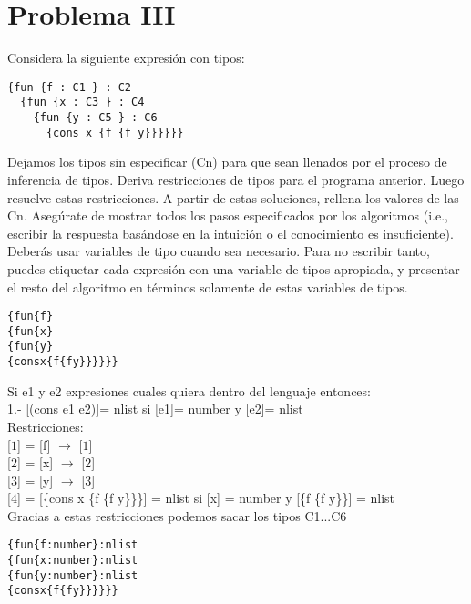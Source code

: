 \documentclass{article}
\begin{document}
  

\section*{Problema III}
Considera la siguiente expresión con tipos:

\begin{verbatim}
{fun {f : C1 } : C2
  {fun {x : C3 } : C4
    {fun {y : C5 } : C6
      {cons x {f {f y}}}}}}
\end{verbatim}

Dejamos los tipos sin especificar (Cn) para que sean llenados por el proceso
de inferencia de tipos. Deriva restricciones de tipos para el programa anterior.
Luego resuelve estas restricciones. A partir de estas soluciones, rellena los
valores de las Cn. Asegúrate de mostrar todos los pasos especificados por los
algoritmos (i.e., escribir la respuesta basándose en la intuición o el conocimiento
es insuficiente). Deberás usar variables de tipo cuando sea necesario.
Para no escribir tanto, puedes etiquetar cada expresión con una variable de tipos
apropiada, y presentar el resto del algoritmo en términos solamente de estas
variables de tipos.

\begin{alltt}
\{  fun \{f\}
  \{  fun \{x\}
    \{  fun \{y\}
      \{  cons  x   \{f \{f y\}\}\}\}\}\}
\end{alltt}

Si e1 y e2 expresiones cuales quiera dentro del lenguaje entonces:\\
 1.- [(cons e1 e2)]= nlist si [e1]= number y [e2]= nlist\\

Restricciones:\\

[$\boxed{1}$] = [f] $\rightarrow$ [$\boxed{1}$] \\

[$\boxed{2}$] = [x] $\rightarrow$ [$\boxed{2}$] \\

[$\boxed{3}$] = [y] $\rightarrow$ [$\boxed{3}$] \\

[$\boxed{4}$] = [\{cons x \{f \{f y\}\}\}] = nlist si [x] = number y [\{f \{f y\}\}] = nlist \\


Gracias a estas restricciones podemos sacar los tipos C1...C6
\begin{alltt}
\{fun \{f : number \} : nlist
  \{fun \{x : number \} : nlist
    \{fun \{y : number \} : nlist
      \{cons x \{f \{f y\}\}\}\}\}\}
\end{alltt}
\end{document}
